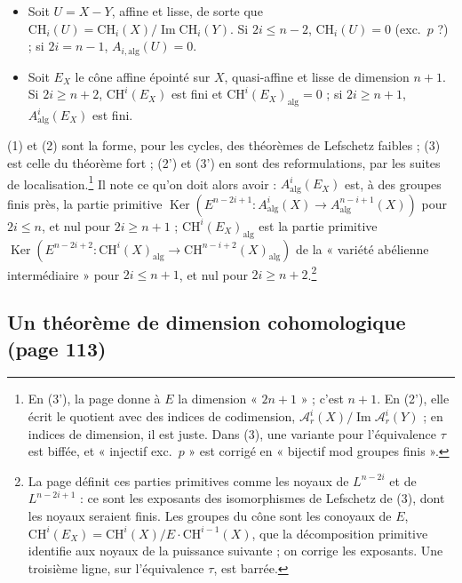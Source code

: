 \documentclass[11pt,a4paper]{article}
\begin{document}
\begin{itemize}
  $E^{p} \colon \mathrm{CH}^{i}(X) \to \mathrm{CH}^{i+p}(X)$ est injectif à des
  groupes finis près si $p \leqslant n - 2i$, surjectif si $p \geqslant n - 2i +
  1$.
  \item[(2')] Soit $U = X - Y$, affine et lisse, de sorte que $\mathrm{CH}_{i}(U) =
  \mathrm{CH}_{i}(X)/\operatorname{Im}\mathrm{CH}_{i}(Y)$. Si $2i \leqslant n - 2$,
  $\mathrm{CH}_{i}(U) = 0$ (exc.\ $p$ ?) ; si $2i = n - 1$, $A_{i,\mathrm{alg}}(U)
  = 0$.
  \item[(3')] Soit $E_{X}$ le cône affine épointé sur $X$, quasi-affine et lisse
  de dimension $n + 1$. Si $2i \geqslant n + 2$, $\mathrm{CH}^{i}(E_{X})$ est fini
  et $\mathrm{CH}^{i}(E_{X})_{\mathrm{alg}} = 0$ ; si $2i \geqslant n + 1$,
  $A^{i}_{\mathrm{alg}}(E_{X})$ est fini.
\end{itemize}

(1) et (2) sont la forme, pour les cycles, des théorèmes de Lefschetz faibles ;
(3) est celle du théorème fort ; (2') et (3') en sont des reformulations, par
les suites de localisation.\footnote{En (3'), la page donne à $E$ la dimension
« $2n+1$ » ; c'est $n + 1$. En (2'), elle écrit le quotient avec des indices de
codimension, $\mathcal{A}^{i}_{r}(X)/\operatorname{Im}\mathcal{A}^{i}_{r}(Y)$ ;
en indices de dimension, il est juste. Dans (3), une variante pour l'équivalence
$\tau$ est biffée, et « injectif exc.\ $p$ » est corrigé en « bijectif mod
groupes finis ».} Il note ce qu'on doit alors avoir :
$A^{i}_{\mathrm{alg}}(E_{X})$ est, à des groupes finis près, la partie primitive
$\operatorname{Ker}(E^{n-2i+1} \colon A^{i}_{\mathrm{alg}}(X) \to
A^{n-i+1}_{\mathrm{alg}}(X))$ pour $2i \leqslant n$, et nul pour $2i \geqslant n +
1$ ; $\mathrm{CH}^{i}(E_{X})_{\mathrm{alg}}$ est la partie primitive
$\operatorname{Ker}(E^{n-2i+2} \colon \mathrm{CH}^{i}(X)_{\mathrm{alg}} \to
\mathrm{CH}^{n-i+2}(X)_{\mathrm{alg}})$ de la « variété abélienne
intermédiaire » pour $2i \leqslant n + 1$, et nul pour $2i \geqslant n +
2$.\footnote{La page définit ces parties primitives comme les noyaux de
$L^{n-2i}$ et de $L^{n-2i+1}$ : ce sont les exposants des isomorphismes de
Lefschetz de (3), dont les noyaux seraient finis. Les groupes du cône sont les
conoyaux de $E$, $\mathrm{CH}^{i}(E_{X}) = \mathrm{CH}^{i}(X)/E\cdot
\mathrm{CH}^{i-1}(X)$, que la décomposition primitive identifie aux noyaux de
la puissance suivante ; on corrige les exposants. Une troisième ligne, sur
l'équivalence $\tau$, est barrée.}

\subsection*{Un théorème de dimension cohomologique (page 113)}
\end{document}
